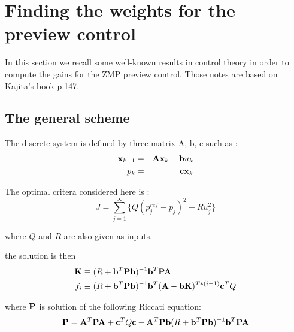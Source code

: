 \section{Finding the weights for the preview control }

In this section we recall some well-known results in control theory in order to compute 
the gains for the ZMP preview control. Those notes are based on Kajita's book \cite{Kajita2005} p.147.

\subsection{The general scheme \cite{Katayama1985}}
The discrete system is	defined by three matrix A, b, c
     such as :
     \begin{equation}
	\begin{aligned}
     {\bf x}_{k+1} & =& {\bf A} {\bf x}_k + {\bf b} u_k \\
     p_k &=& {\bf cx}_k\\
	\end{aligned}
     \end{equation}

     The optimal critera considered here is :
     \begin{equation}
     J = \sum^{\infty}_{j=1} \{ Q(p^{ref}_j -p_j)^2 + Ru_j^2 \}
     \end{equation}

     where $ Q $ and $ R $ are also given as inputs.

    the solution is then 
     \begin{equation}
	\begin{aligned}	
     {\bf K} & \equiv  (R + {\bf b}^T{\bf Pb})^{-1}{\bf b}^T{\bf PA} \\
     f_i & \equiv  (R + {\bf b}^T{\bf Pb})^{-1}{\bf b}^T({\bf A}-{\bf bK})^{T*(i-1)}{\bf c}^TQ \\
	\end{aligned}
     \end{equation}


 where $ {\bf P} $ is solution of the following Riccati equation:
\begin{equation}
 {\bf P} = {\bf A}^T {\bf PA} + {\bf c}^TQ{\bf c} - {\bf A}^T{\bf Pb}(R + {\bf b}^T{\bf Pb})^{-1}{\bf b}^T{\bf PA}
\end{equation}

